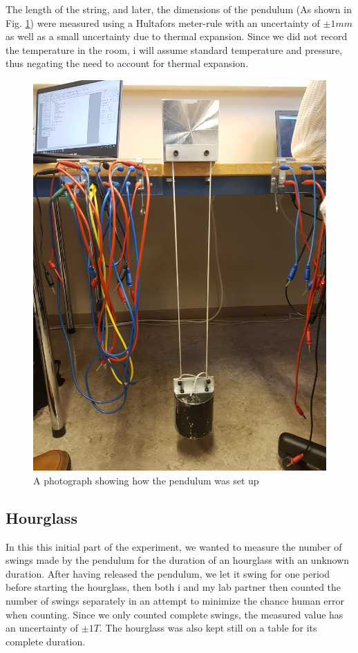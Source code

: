 \documentclass[%
 reprint,
 amsmath,amssymb,
 aps,
]{revtex4-1}
\begin{document}
        The length of the string, and later, the dimensions of the pendulum (As shown in Fig. \ref{fig:pendulum1}) were measured using a Hultafors meter-rule with an uncertainty of $\pm 1mm$ as well as a small uncertainty due to thermal expansion. Since we did not record the temperature in the room, i will assume standard temperature and pressure, thus negating the need to account for thermal expansion.

    \begin{figure}
        \center
        \includegraphics[scale=0.06, angle=270]{experiment1.jpg}
        \caption{A photograph showing how the pendulum was set up}
        \label{fig:pendulum1}
    \end{figure}

    \subsection{\label{subsec:exp_hourglass}Hourglass}
        In this this initial part of the experiment, we wanted to measure the number of swings made by the pendulum for the duration of an hourglass with an unknown duration. After having released the pendulum, we let it swing for one period before starting the hourglass, then both i and my lab partner then counted the number of swings separately in an attempt to minimize the chance human error when counting. Since we only counted complete swings, the measured value has an uncertainty of $\pm 1T$. The hourglass was also kept still on a table for its complete duration.
    
\end{document}
